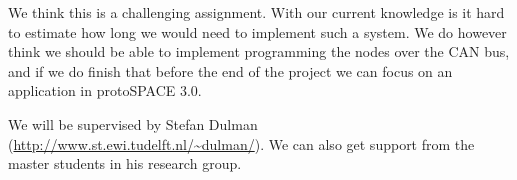 \documentclass[twocolumn]{article}
\begin{document}
	We think this is a challenging assignment.
	With our current knowledge is it hard to estimate how long we would need to implement such a system.
	We do however think we should be able to implement programming the nodes over the CAN bus, and if we do finish that before the end of the project we can focus on an application in protoSPACE 3.0.
	
	We will be supervised by Stefan Dulman (\url{http://www.st.ewi.tudelft.nl/~dulman/}).
	We can also get support from the master students in his research group.
\end{document}
